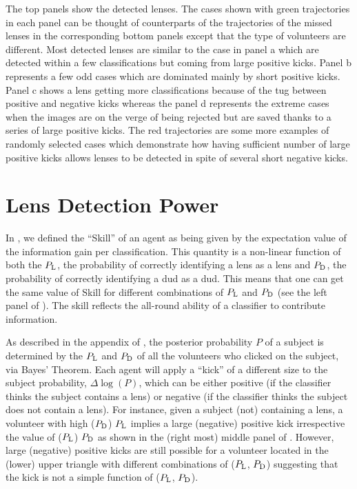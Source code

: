 \documentclass[useAMS,usenatbib,a4paper]{mn2e}
\begin{document}
The top panels show the detected lenses. The cases shown with green trajectories
in each panel can be thought of counterparts of the trajectories of the missed
lenses in the corresponding bottom panels except that the type of volunteers are
different. Most detected lenses are similar to the case in panel a which are
detected within a few classifications but coming from large positive kicks.
Panel b represents a few odd cases which are dominated mainly by short positive
kicks. Panel c shows a lens getting more classifications because of the tug
between positive and negative kicks whereas the panel d represents the extreme
cases when the images are on the verge of being rejected but are saved thanks
to a series of large positive kicks. The red trajectories are some more
examples of randomly selected cases which demonstrate how having sufficient
number of large positive kicks allows lenses to be detected in spite of several
short negative kicks.

\section{Lens Detection Power}
\label{appendix:power}

In \PaperOne, we defined the ``Skill'' of an agent as being given by the
expectation value of the information gain per classification. This
quantity is a non-linear function of both the $P_{\rm L}$, the
probability of correctly identifying a lens as a lens and $P_{\rm D}$,
the probability of correctly identifying a dud as a dud. This means that
one can get the same value of Skill for different combinations of
$P_{\rm L}$ and $P_{\rm D}$ (see the left panel of
). The skill reflects the all-round ability of a
classifier to contribute information.

As described in the appendix of \PaperOne, the posterior probability $P$
of a subject is determined by the $P_{\rm L}$ and $P_{\rm D}$ of all the
volunteers who clicked on the subject, via Bayes' Theorem. Each agent
will apply a ``kick'' of a different size to the subject probability,
$\Delta\log(P)$, which can be either positive (if the classifier thinks
the subject contains a lens) or negative (if the classifier thinks the
subject does not contain a lens). For instance, given a subject
(not) containing a lens, a volunteer with high ($P_{\rm D}$) $P_{\rm L}$
implies a large (negative) positive kick irrespective the value of
($P_{\rm L}$) $P_{\rm D}$ as shown in the (right most) middle panel of
. However, large (negative) positive kicks are
still possible for a volunteer located in the (lower) upper triangle
with different combinations of ($P_{\rm L}$, $P_{\rm D}$) suggesting that
the kick is not a simple function of ($P_{\rm L}$, $P_{\rm D}$).
\end{document}
